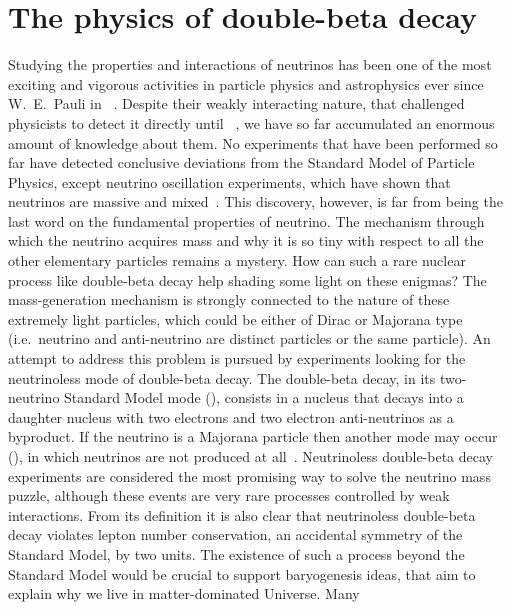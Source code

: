 
\chapter{The physics of double-beta decay}\label{chap:theory}

Studying the properties and interactions of neutrinos has been one of the most exciting
and vigorous activities in particle physics and astrophysics ever since W.~E.~Pauli in
~\cite{Brown1978}. Despite their weakly interacting nature, that challenged physicists
to detect it directly until ~\cite{Cowan1956}, we have so far accumulated an enormous
amount of knowledge about them. No experiments that have been performed so far have
detected conclusive deviations from the Standard Model of Particle Physics, except
neutrino oscillation experiments, which have shown that neutrinos are massive and
mixed~\cite{Fukuda1998, Ahmad2002, Eguchi2003, Kajita2016, McDonald2016}.  This discovery,
however, is far from being the last word on the fundamental properties of neutrino. The
mechanism through which the neutrino acquires mass and why it is so tiny with respect to
all the other elementary particles remains a mystery. How can such a rare nuclear process
like double-beta decay help shading some light on these enigmas?
\newpar
The mass-generation mechanism is strongly connected to the nature of these extremely light
particles, which could be either of Dirac or Majorana type (i.e.~neutrino and
anti-neutrino are distinct particles or the same particle). An attempt to address this
problem is pursued by experiments looking for the neutrinoless mode of double-beta decay.
The double-beta decay, in its two-neutrino Standard Model mode (\nnbb), consists in a
nucleus that decays into a daughter nucleus with two electrons and two electron
anti-neutrinos as a byproduct. If the neutrino is a Majorana particle then another mode
may occur (\onbb), in which neutrinos are not produced at all~\cite{Schechter1982}.
Neutrinoless double-beta decay experiments are considered the most promising way to solve
the neutrino mass puzzle, although these events are very rare processes controlled by weak
interactions.
\newpar
From its definition it is also clear that neutrinoless double-beta decay violates lepton
number conservation, an accidental symmetry of the Standard Model, by two units. The
existence of such a process beyond the Standard Model would be crucial to support
baryogenesis ideas, that aim to explain why we live in matter-dominated Universe.  Many
